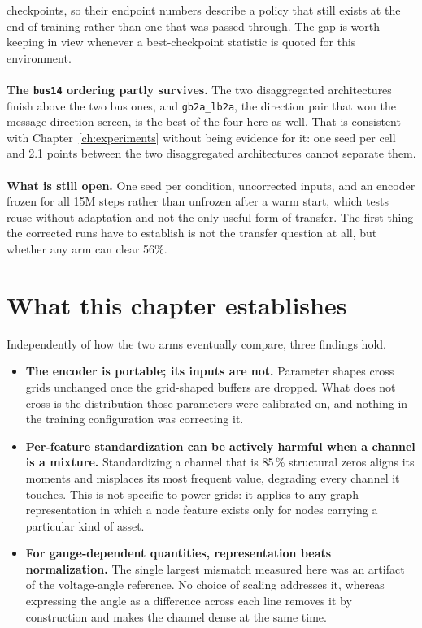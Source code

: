 checkpoints, so their endpoint numbers describe a policy that still exists at
the end of training rather than one that was passed through. The gap is worth
keeping in view whenever a best-checkpoint statistic is quoted for this
environment.
\\
\\
\textbf{The \texttt{bus14} ordering partly survives.} The two disaggregated
architectures finish above the two bus ones, and \texttt{gb2a\_lb2a}, the
direction pair that won the message-direction screen, is the best of the four
here as well. That is consistent with Chapter~\ref{ch:experiments} without being
evidence for it: one seed per cell and 2.1 points between the two disaggregated
architectures cannot separate them.
\\
\\
\textbf{What is still open.} One seed per condition, uncorrected inputs, and an
encoder frozen for all 15M steps rather than unfrozen after a warm start, which
tests reuse without adaptation and not the only useful form of transfer. The
first thing the corrected runs have to establish is not the transfer question at
all, but whether any arm can clear 56\%.


\section{What this chapter establishes}
\label{sec:wcci-summary}

Independently of how the two arms eventually compare, three findings hold.

\begin{itemize}
  \item \textbf{The encoder is portable; its inputs are not.} Parameter shapes
  cross grids unchanged once the grid-shaped buffers are dropped. What does not
  cross is the distribution those parameters were calibrated on, and nothing in
  the training configuration was correcting it.

  \item \textbf{Per-feature standardization can be actively harmful when a
  channel is a mixture.} Standardizing a channel that is 85\,\% structural zeros
  aligns its moments and misplaces its most frequent value, degrading every
  channel it touches. This is not specific to power grids: it applies to any
  graph representation in which a node feature exists only for nodes carrying a
  particular kind of asset.

  \item \textbf{For gauge-dependent quantities, representation beats
  normalization.} The single largest mismatch measured here was an artifact of
  the voltage-angle reference. No choice of scaling addresses it, whereas
  expressing the angle as a difference across each line removes it by
  construction and makes the channel dense at the same time.
\end{itemize}
